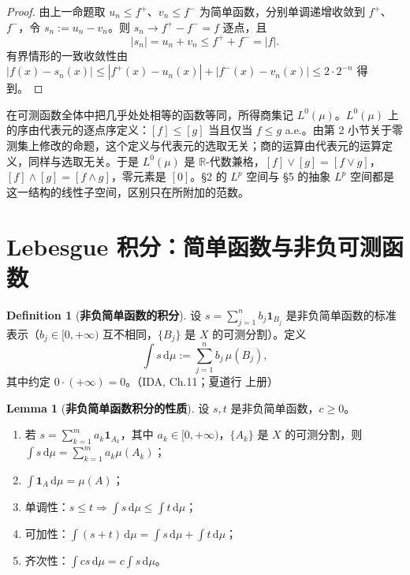 \documentclass[oneside]{book}
\theoremstyle{definition}
\newcommand{\R}{\mathbb{R}}
\newcommand{\dd}{\mathrm{d}}
\theoremstyle{definition}
\newtheorem{definition}{Definition}[section]
\newtheorem{lemma}{Lemma}[section]
\begin{document}
	\begin{proof}
		由上一命题取 $u_n\leqslant f^{+}$、$v_n\leqslant f^{-}$ 为简单函数，分别单调递增收敛到 $f^{+}$、$f^{-}$，令 $s_n:=u_n-v_n$。则 $s_n\to f^{+}-f^{-}=f$ 逐点，且
		\[
		|s_n|=u_n+v_n\leqslant f^{+}+f^{-}=|f|.
		\]
		有界情形的一致收敛性由 $|f(x)-s_n(x)|\leqslant|f^{+}(x)-u_n(x)|+|f^{-}(x)-v_n(x)|\leqslant2\cdot2^{-n}$ 得到。
	\end{proof}
	
	\begin{note}
		在可测函数全体中把几乎处处相等的函数等同，所得商集记 $L^{0}(\mu)$。$L^{0}(\mu)$ 上的序由代表元的逐点序定义：$[f]\leqslant[g]$ 当且仅当 $f\leqslant g$ a.e.。由第 2 小节关于零测集上修改的命题，这个定义与代表元的选取无关；商的运算由代表元的运算定义，同样与选取无关。于是 $L^{0}(\mu)$ 是 $\R$-代数兼格，$[f]\vee[g]=[f\vee g]$，$[f]\wedge[g]=[f\wedge g]$，零元素是 $[0]$。\S2 的 $L^{p}$ 空间与 \S5 的抽象 $L^{p}$ 空间都是这一结构的线性子空间，区别只在所附加的范数。
	\end{note}
	
	\section{Lebesgue 积分：简单函数与非负可测函数}
	
	\begin{definition}[\bfseries{非负简单函数的积分}]
		设 $s=\sum_{j=1}^{n}b_j\mathbf{1}_{B_j}$ 是非负简单函数的标准表示（$b_j\in[0,+\infty)$ 互不相同，$\{B_j\}$ 是 $X$ 的可测分割）。定义
		\[
		\int s\,\dd\mu:=\sum_{j=1}^{n}b_j\,\mu(B_j),
		\]
		其中约定 $0\cdot(+\infty)=0$。（IDA, Ch.11；夏道行 上册）
	\end{definition}
	
	\begin{lemma}[\bfseries{非负简单函数积分的性质}]
		设 $s,t$ 是非负简单函数，$c\geqslant0$。
		\begin{enumerate}
			\item 若 $s=\sum_{k=1}^{m}a_k\mathbf{1}_{A_k}$，其中 $a_k\in[0,+\infty)$，$\{A_k\}$ 是 $X$ 的可测分割，则 $\int s\,\dd\mu=\sum_{k=1}^{m}a_k\mu(A_k)$；
			\item $\int\mathbf{1}_{A}\,\dd\mu=\mu(A)$；
			\item 单调性：$s\leqslant t\Rightarrow\int s\,\dd\mu\leqslant\int t\,\dd\mu$；
			\item 可加性：$\int(s+t)\,\dd\mu=\int s\,\dd\mu+\int t\,\dd\mu$；
			\item 齐次性：$\int cs\,\dd\mu=c\int s\,\dd\mu$。
		\end{enumerate}
	\end{lemma}
	
\end{document}

